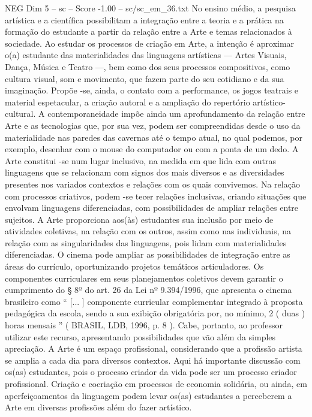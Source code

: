 \begin{textsample}{NEG Dim 5 – sc – Score -1.00 – sc/sc\_em\_36.txt}
No ensino médio, a pesquisa artística e a científica possibilitam a integração entre a teoria e a prática na formação do estudante a partir da relação entre a Arte e temas relacionados à sociedade.
Ao estudar os processos de criação em Arte, a intenção é aproximar o(a) estudante das materialidades das linguagens artísticas — Artes Visuais, Dança, Música e Teatro —, bem como dos seus processos compositivos, como cultura visual, som e movimento, que fazem parte do seu cotidiano e da sua imaginação.
Propõe -se, ainda, o contato com a performance, os jogos teatrais e material espetacular, a criação autoral e a ampliação do repertório artístico-cultural.
A contemporaneidade impõe ainda um aprofundamento da relação entre Arte e as tecnologias que, por sua vez, podem ser compreendidas desde o uso da materialidade nas paredes das cavernas até o tempo atual, no qual podemos, por exemplo, desenhar com o mouse do computador ou com a ponta de um dedo.
A Arte constitui -se num lugar inclusivo, na medida em que lida com outras linguagens que se relacionam com signos dos mais diversos e as diversidades presentes nos variados contextos e relações com os quais convivemos.
Na relação com processos criativos, podem -se tecer relações inclusivas, criando situações que envolvam linguagens diferenciadas, com possibilidades de ampliar relações entre sujeitos.
A Arte proporciona aos(às) estudantes sua inclusão por meio de atividades coletivas, na relação com os outros, assim como nas individuais, na relação com as singularidades das linguagens, pois lidam com materialidades diferenciadas.
O cinema pode ampliar as possibilidades de integração entre as áreas do currículo, oportunizando projetos temáticos articuladores.
Os componentes curriculares em seus planejamentos coletivos devem garantir o cumprimento do § 8º do art. 26 da Lei nº 9.394/1996, que apresenta o cinema brasileiro como “ [... ] componente curricular complementar integrado à proposta pedagógica da escola, sendo a sua exibição obrigatória por, no mínimo, 2 ( duas ) horas mensais ” ( BRASIL, LDB, 1996, p. 8 ).
Cabe, portanto, ao professor utilizar este recurso, apresentando possibilidades que vão além da simples apreciação.
A Arte é um espaço profissional, considerando que a profissão artista se amplia a cada dia para diversos contextos.
Aqui há importante discussão com os(as) estudantes, pois o processo criador da vida pode ser um processo criador profissional.
Criação e cocriação em processos de economia solidária, ou ainda, em aperfeiçoamentos da linguagem podem levar os(as) estudantes a perceberem a Arte em diversas profissões além do fazer artístico.

\end{textsample}
